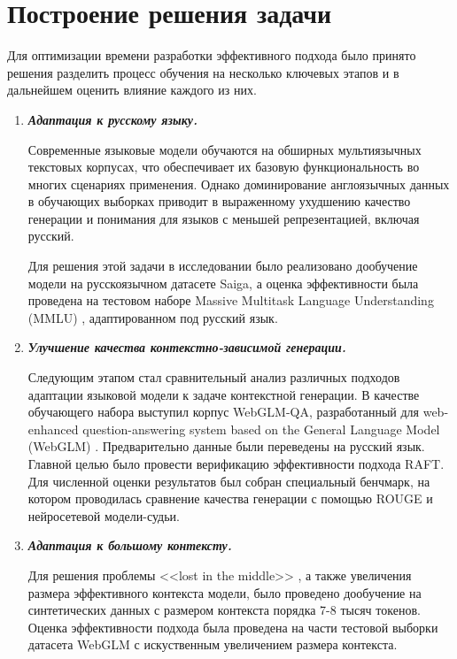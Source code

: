 \section{Построение решения задачи}
\label{sec:Solution} 

Для оптимизации времени разработки эффективного подхода было принято решения разделить процесс обучения на несколько ключевых этапов и в дальнейшем оценить влияние каждого из них.

\begin{enumerate}

  \item \textbf{\textit{Адаптация к русскому языку.}}

    Современные языковые модели обучаются на обширных мультиязычных текстовых корпусах, что обеспечивает их базовую функциональность во многих сценариях применения. Однако доминирование англоязычных данных в обучающих выборках приводит в выраженному ухудшению качество генерации и понимания для языков с меньшей репрезентацией, включая русский.

    Для решения этой задачи в исследовании было реализовано дообучение модели на русскоязычном датасете Saiga, а оценка эффективности была проведена на тестовом наборе Massive Multitask Language Understanding (MMLU) \cite{MMLU}, адаптированном под русский язык.
  
 \item \textit{\textbf{Улучшение качества контекстно-зависимой генерации.}}
  
    Следующим этапом стал сравнительный анализ различных подходов адаптации языковой модели к задаче контекстной генерации. В качестве обучающего набора выступил корпус WebGLM-QA, разработанный для web-enhanced question-answering system based on the General Language Model (WebGLM) \cite{WebGLM}. Предварительно данные были переведены на русский язык. Главной целью было провести верификацию эффективности подхода RAFT. Для численной оценки результатов был собран специальный бенчмарк, на котором проводилась сравнение качества генерации с помощью ROUGE и нейросетевой модели-судьи.  
  
  \item \textit{\textbf{Адаптация к большому контексту.}}
  
    Для решения проблемы <<lost in the middle>> \cite{lost_in_the_middle}, а также увеличения размера эффективного контекста модели, было проведено дообучение на синтетических данных с размером контекста порядка 7-8 тысяч токенов. Оценка эффективности подхода была проведена на части тестовой выборки датасета WebGLM с искуственным увеличением размера контекста.
  
\end{enumerate}

